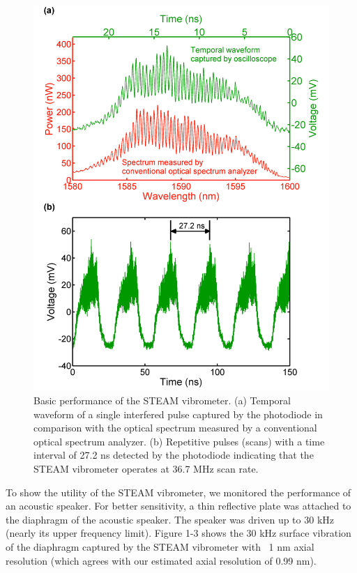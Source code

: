 \begin{figure}[htb!]
\centering
\includegraphics[scale=1]{APL_2011/Figure2.png}
\caption{Basic performance of the STEAM vibrometer. (a) Temporal waveform of a single interfered pulse captured by the photodiode in comparison with the optical spectrum measured by a conventional optical spectrum analyzer. (b) Repetitive pulses (scans) with a time interval of 27.2 ns detected by the photodiode indicating that the STEAM vibrometer operates at 36.7 MHz scan rate.}
\label{fig:APL_2011_Figure2}
\end{figure}

To show the utility of the STEAM vibrometer, we monitored the performance of an acoustic speaker. For better sensitivity, a thin reflective plate was attached to the diaphragm of the acoustic speaker. The speaker was driven up to 30 kHz (nearly its upper frequency limit). Figure 1-3 shows the 30 kHz surface vibration of the diaphragm captured by the STEAM vibrometer with ~1 nm axial resolution (which agrees with our estimated axial resolution of 0.99 nm).

